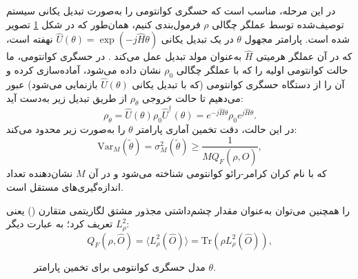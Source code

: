 در این مرحله، مناسب است که حسگری کوانتومی را به‌صورت تبدیل یکانی سیستم توصیف‌شده توسط عملگر چگالی $\rho$ فرمول‌بندی کنیم، همان‌طور که در شکل \ref{fig:11-2} تصویر شده است. پارامتر مجهول $\theta$ در یک تبدیل یکانی $\hat{U}(\theta) = \exp(-j\hat{H}\theta)$ نهفته است، که در آن عملگر هرمیتی $\hat{H}$ به‌عنوان مولد تبدیل عمل می‌کند \cite{20}. در حسگری کوانتومی، ما حالت کوانتومی اولیه را که با عملگر چگالی $\rho_0$ نشان داده می‌شود، آماده‌سازی کرده و آن را از دستگاه حسگری کوانتومی (که با تبدیل یکانی $\hat{U}(\theta)$ بازنمایی می‌شود) عبور می‌دهیم تا حالت خروجی $\rho_\theta$ از طریق تبدیل زیر به‌دست آید:
\begin{equation}
	\rho_\theta = \hat{U}(\theta) \rho_0 \hat{U}^\dagger(\theta) = e^{-j\hat{H}\theta} \rho_0 e^{j\hat{H}\theta}.
	\label{eq:11-44}
\end{equation}
در این حالت،  دقت تخمین آماری پارامتر $\theta$ را به‌صورت زیر محدود می‌کند:
\begin{equation}
	\text{Var}_M(\tilde{\theta}) = \sigma_M^2(\tilde{\theta}) \geq \frac{1}{M Q_F(\rho, \hat{O})},
	\label{eq:11-45}
\end{equation}
که با نام کران کرامر-رائو کوانتومی شناخته می‌شود و در آن $M$ نشان‌دهنده تعداد اندازه‌گیری‌های مستقل است.

 را همچنین می‌توان به‌عنوان مقدار چشم‌داشتی مجذور مشتق لگاریتمی متقارن () یعنی $L_\rho^2$ تعریف کرد؛ به عبارت دیگر:
\begin{equation}
	Q_F(\rho, \hat{O}) = \langle L_\rho^2(\hat{O}) \rangle = \text{Tr}(\rho L_\rho^2(\hat{O})),
	\label{eq:11-46}
\end{equation}

\begin{figure}[ht]
	\centering
	\caption{مدل حسگری کوانتومی برای تخمین پارامتر $\theta$.}
	\label{fig:11-2}
\end{figure}

